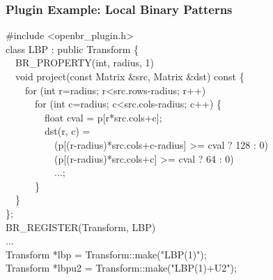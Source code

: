 \documentclass[12pt]{beamer}
\begin{document}
\begin{frame}[fragile]
\frametitle{Plugin Example: Local Binary Patterns}
{\footnotesize
\pause
\#include  \textless openbr\_plugin.h\textgreater \\
\pause
class LBP : public Transform \{ \\
\pause
\ \ BR\_PROPERTY(int, radius, 1) \\
\pause
\ \ void project(const Matrix \&src, Matrix \&dst) const \{ \\
\pause
\ \ \ \ for (int r=radius; r\textless src.rows-radius; r++) \\
\ \ \ \ \ \ for (int c=radius; c\textless src.cols-radius; c++) \{ \\
\ \ \ \ \ \ \ \ float cval = p[r*src.cols+c]; \\
\ \ \ \ \ \ \ \ dst(r, c) = \\
\ \ \ \ \ \ \ \ \ \ (p[(r-radius)*src.cols+c-radius] \textgreater = cval ? 128 : 0) \textbar \\
\ \ \ \ \ \ \ \ \ \ (p[(r-radius)*src.cols+c] \textgreater = cval ? 64 : 0) \textbar \\
\ \ \ \ \ \ \ \ \ \ ...; \\
 \ \ \ \ \ \ \} \\
\pause
\ \ \} \\
\}; \\
\pause
BR\_REGISTER(Transform, LBP) \\
\pause
... \\
Transform *lbp = Transform::make("LBP(1)"); \\
\pause
Transform *lbpu2 = Transform::make("LBP(1)+U2"); \\
}
\end{frame}

\end{document}
